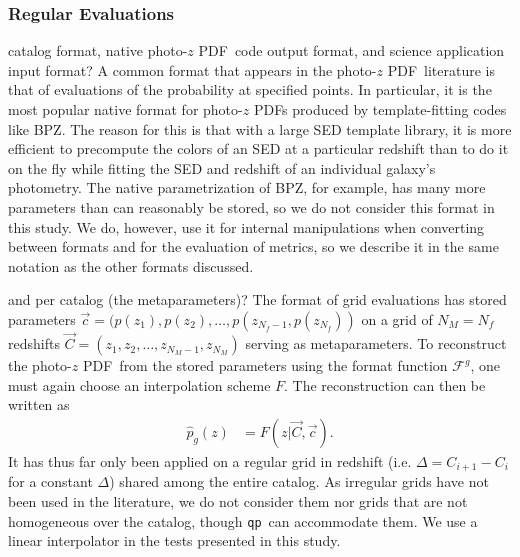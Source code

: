 \documentclass[\docopts]{\docclass}
\newcommand{\qp}{\texttt{qp}}
\newcommand{\pz}{photo-$z$ PDF}
\begin{document}
\subsubsection{Regular Evaluations}
\label{sec:grid}

catalog format, native \pz\ code output format, and science application input 
format?
A common format that appears in the \pz\ literature is that of evaluations of 
the probability at specified points.  In particular, it is the most popular 
native format for \pz s produced by template-fitting codes like BPZ.  
\citep{benitez_bayesian_2000}  The reason for this is that with a large SED 
template library, it is more efficient to precompute the colors of an SED at a 
particular redshift than to do it on the fly while fitting the SED and redshift 
of an individual galaxy's photometry.  The native parametrization of BPZ, for 
example, has many more parameters than can reasonably be stored, so we do not 
consider this format in this study.  We do, however, use it for internal 
manipulations when converting between formats and for the evaluation of 
metrics, so we describe it in the same notation as the other formats discussed.

and per catalog (the metaparameters)?
The format of grid evaluations has stored parameters $\vec{c}=(p(z_{1}), 
p(z_{2}), \dots, p(z_{N_{f}-1}, p(z_{N_{f}}))$ on a grid of $N_{M}=N_{f}$ 
redshifts $\vec{C}=(z_{1}, z_{2}, \dots, z_{N_{M}-1}, z_{N_{M}})$ serving as 
metaparameters.  To reconstruct the \pz\ from the stored parameters using the 
format function $\mathcal{F}^{g}$, one must again choose an interpolation 
scheme $F$.  The reconstruction can then be written as
\begin{align}
  \label{eq:gridded}
  \hat{p}_{g}(z) &= F(z| \vec{C}, \vec{c}).
\end{align}
It has thus far only been applied on a regular grid in redshift (i.e. 
$\Delta=C_{i+1}-C_{i}$ for a constant $\Delta$) shared among the entire 
catalog.  As irregular grids have not been used in the literature, we do not 
consider them nor grids that are not homogeneous over the catalog, though \qp\ 
can accommodate them.  We use a linear interpolator in the tests presented in 
this study.
\end{document}
